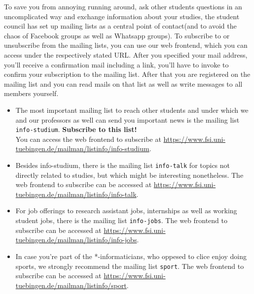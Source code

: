 
To save you from annoying running around, ask other students questions in an uncomplicated way and exchange information about your studies, the student council has set up mailing lists as a central point of contact(and to avoid the chaos of Facebook groups as well as Whatsapp groups).
To subscribe to or unsubscribe from the mailing lists, you can use our web frontend, which you can access under the respectively stated URL. After you specified your mail address, you'll receive a confirmation mail including a link, you'll have to invoke to confirm your subscription to the mailing list. After that you are registered on the mailing list and you can read mails on that list as well as write messages to all members yourself.

\begin{itemize}
    \item The most important mailing list to reach other students and under which we and our professors as well can send you important news is the mailing list \texttt{ info-studium}. \textbf{Subscribe to this list!}\\
You can access the web frontend to subscribe at \url{https://www.fsi.uni-tuebingen.de/mailman/listinfo/info-studium}.
\item Besides info-studium, there is the mailing list \texttt{info-talk} for topics not directly related to studies, but which might be interesting nonetheless. The web frontend to subscribe can be accessed at \url{https://www.fsi.uni-tuebingen.de/mailman/listinfo/info-talk}.
\item For job offerings to research assistant jobs, internships as well as working student jobs, there is the mailing list \texttt{info-jobs}. The web frontend to subscribe can be accessed at \url{https://www.fsi.uni-tuebingen.de/mailman/listinfo/info-jobs}.
\item In case you're part of the *-informaticians, who oppesed to clice enjoy doing sports, we strongly recommend the mailing list \texttt{sport}. The web frontend to subscribe can be accessed at \url{https://www.fsi.uni-tuebingen.de/mailman/listinfo/sport}. 
\end{itemize}

